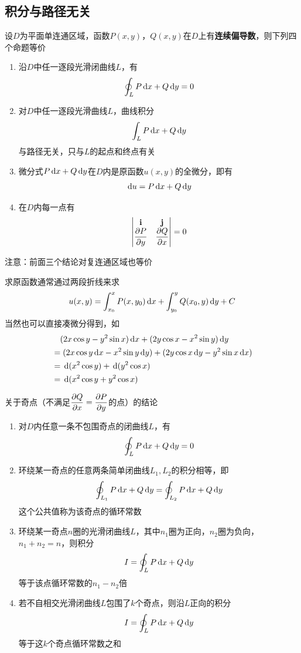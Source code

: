 \subsection{积分与路径无关}
\begin{theorem}
设$D$为平面单连通区域，函数$P(x,y)$，$Q(x,y)$在$D$上有\textbf{连续偏导数}，则下列四个命题等价
\begin{enumerate}
	\item 沿$D$中任一逐段光滑闭曲线$L$，有
	\[\oint_LP\,\mathrm{d} x+Q\,\mathrm{d} y=0\]
	\item 对$D$中任一逐段光滑曲线$L$，曲线积分
	\[\int_LP\,\mathrm{d} x+Q\,\mathrm{d} y\]
	与路径无关，只与$L$的起点和终点有关
	\item 微分式$P\,\mathrm{d} x+Q\,\mathrm{d} y$在$D$内是原函数$u(x,y)$的全微分，即有
	\[\,\mathrm{d} u=P\,\mathrm{d} x+Q\,\mathrm{d} y\]
	\item 在$D$内每一点有
	\[\begin{vmatrix}\mathbf{i}&\mathbf{j}\\\dfrac{\partial P}{\partial y}&\dfrac{\partial Q}{\partial x}\end{vmatrix}=0\]
\end{enumerate}
注意：前面三个结论对复连通区域也等价
\end{theorem}
求原函数通常通过两段折线来求
\[u(x,y)=\int_{x_0}^x P(x,y_0)\,\mathrm{d} x+\int_{y_0}^yQ(x_0,y)\,\mathrm{d} y+C\]
当然也可以直接凑微分得到，如
\[\begin{aligned}
&\quad(2x\cos y-y^2\sin x)\,\mathrm{d} x+(2y\cos x-x^2\sin y)\,\mathrm{d} y\\
&=(2x\cos y\,\mathrm{d} x-x^2\sin y\,\mathrm{d} y)+(2y\cos x\,\mathrm{d} y-y^2\sin x\,\mathrm{d} x)\\
&=\,\mathrm{d} (x^2\cos y)+\,\mathrm{d} (y^2\cos x)\\
&=\,\mathrm{d} (x^2\cos y + y^2\cos x)
\end{aligned}\]
\begin{theorem}[奇点]
关于奇点（不满足$\dfrac{\partial Q}{\partial x}=\dfrac{\partial P}{\partial y}$的点）的结论
\begin{enumerate}
	\item 对$D$内任意一条不包围奇点的闭曲线$L$，有
	\[\oint_LP\,\mathrm{d} x+Q\,\mathrm{d} y=0\]
	\item 环绕某一奇点的任意两条简单闭曲线$L_1,L_2$的积分相等，即
	\[\oint_{L_1}P\,\mathrm{d} x+Q\,\mathrm{d} y=\oint_{L_2}P\,\mathrm{d} x+Q\,\mathrm{d} y\]
	这个公共值称为该奇点的循环常数
	\item 环绕某一奇点$n$圈的光滑闭曲线$L$，其中$n_1$圈为正向，$n_2$圈为负向，$n_1+n_2=n$，则积分
	\[I=\oint_LP\,\mathrm{d} x+Q\,\mathrm{d} y\]
	等于该点循环常数的$n_1-n_2$倍
	\item 若不自相交光滑闭曲线$L$包围了$k$个奇点，则沿$L$正向的积分
	\[I=\oint_LP\,\mathrm{d} x+Q\,\mathrm{d} y\]
	等于这$k$个奇点循环常数之和
\end{enumerate}
\end{theorem}
